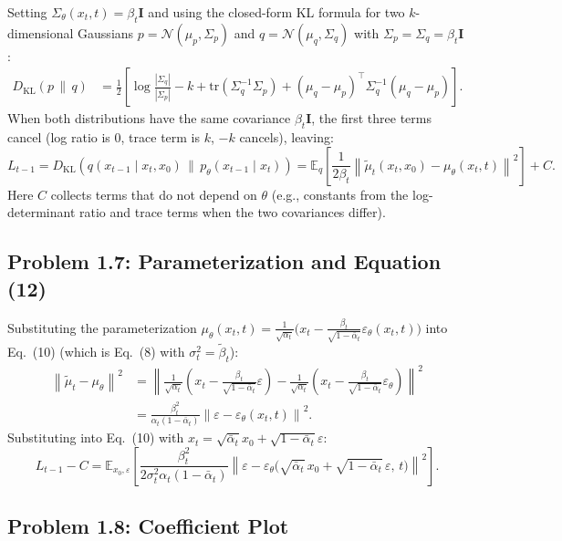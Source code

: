 \documentclass[11pt]{article}
\newcommand{\E}{\mathbb{E}}
\newcommand{\N}{\mathcal{N}}
\newcommand{\KL}[2]{D_{\mathrm{KL}}\!\left(#1\,\|\,#2\right)}
\newcommand{\norm}[1]{\left\|#1\right\|}
\newcommand{\abar}{\bar{\alpha}}
\newcommand{\epsth}{\varepsilon_\theta}
\begin{document}
Setting $\Sigma_\theta(x_t,t)=\beta_t\mathbf{I}$ and using the closed-form KL formula
for two $k$-dimensional Gaussians $p=\N(\mu_p,\Sigma_p)$ and $q=\N(\mu_q,\Sigma_q)$
with $\Sigma_p=\Sigma_q=\beta_t\mathbf{I}$:
\begin{align*}
\KL{p}{q}
&= \frac{1}{2}\!\left[
    \log\frac{|\Sigma_q|}{|\Sigma_p|} - k
    + \mathrm{tr}(\Sigma_q^{-1}\Sigma_p)
    + (\mu_q-\mu_p)^\top\Sigma_q^{-1}(\mu_q-\mu_p)
  \right].
\end{align*}
When both distributions have the same covariance $\beta_t\mathbf{I}$, the first three terms
cancel (log ratio is 0, trace term is $k$, $-k$ cancels), leaving:
\begin{equation}
L_{t-1} = \KL{q(x_{t-1}\mid x_t,x_0)}{p_\theta(x_{t-1}\mid x_t)}
= \E_q\!\left[\frac{1}{2\beta_t}
              \norm{\tilde\mu_t(x_t,x_0)-\mu_\theta(x_t,t)}^2\right] + C. \tag{8}
\end{equation}
Here $C$ collects terms that do not depend on $\theta$ (e.g., constants from the log-determinant ratio and trace terms when the two covariances differ).

\subsection{Problem 1.7: Parameterization and Equation (12)}

Substituting the parameterization $\mu_\theta(x_t,t) = \frac{1}{\sqrt{\alpha_t}}\bigl(
x_t - \frac{\beta_t}{\sqrt{1-\abar_t}}\epsth(x_t,t)\bigr)$ into Eq.~(10)
(which is Eq.~(8) with $\sigma_t^2=\tilde\beta_t$):
\begin{align*}
\norm{\tilde\mu_t - \mu_\theta}^2
&= \left\|\frac{1}{\sqrt{\alpha_t}}\!\left(x_t - \frac{\beta_t}{\sqrt{1-\abar_t}}\varepsilon\right)
   -\frac{1}{\sqrt{\alpha_t}}\!\left(x_t - \frac{\beta_t}{\sqrt{1-\abar_t}}\epsth\right)\right\|^2\\
&= \frac{\beta_t^2}{\alpha_t(1-\abar_t)}\norm{\varepsilon - \epsth(x_t,t)}^2.
\end{align*}
Substituting into Eq.~(10) with $x_t = \sqrt{\abar_t}x_0 + \sqrt{1-\abar_t}\varepsilon$:
\begin{equation}
L_{t-1} - C
= \E_{x_0,\varepsilon}\!\left[
    \frac{\beta_t^2}{2\sigma_t^2\alpha_t(1-\abar_t)}
    \norm{\varepsilon - \epsth\!\bigl(\sqrt{\abar_t}\,x_0 + \sqrt{1-\abar_t}\,\varepsilon,\,t\bigr)}^2
  \right]. \tag{12}
\end{equation}

\subsection{Problem 1.8: Coefficient Plot}
\end{document}
